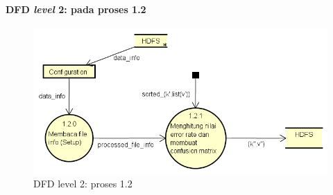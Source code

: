 \paragraph{DFD \textit{level} 2: pada proses 1.2}
\begin{figure}[H]
	\centering
	\includegraphics[scale=0.6]{Diagram/DFD_1_3_Testing_Red}
	\caption[DFD level 2: proses 1.2]{DFD level 2: proses 1.2}
	\label{fig:DFD level 2: proses 1.2}
\end{figure}

